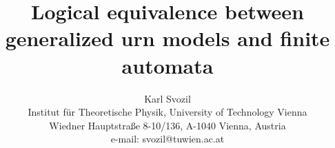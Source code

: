 \documentclass{article}






\title{Logical equivalence between generalized urn models and finite automata}
\author{Karl Svozil\\
 {\small Institut f\"ur Theoretische Physik, University of Technology Vienna }     \\
  {\small Wiedner Hauptstra\ss e 8-10/136,}
  {\small A-1040 Vienna, Austria   }            \\
  {\small e-mail: svozil@tuwien.ac.at}}

\maketitle
\begin{abstract}
To every generalized urn model there exists a finite (Mealy) automaton
with identical propositional calculus.
The converse is true as well.
\end{abstract}




\section{Introduction of concepts}

In what follows we shall explicitly and constructively demonstrate
the equivalence of the empirical logics
(i.e., the propositional calculi) associated with the
generalized urn models (GUM) suggested by
Ron Wright \cite{wright:pent,wright}, and automaton partition logics
(APL)
\cite{svozil-93,schaller-96,dvur-pul-svo,cal-sv-yu,svozil-ql}.
(The result has been  mentioned already in \cite[p.145]{svozil-ql}, but no proof has been given).
The logical equivalence of automaton models (AM)
with generalized urn models suggests that these logics are more general and ``robust''
with respect to changes of the particular model than could have been expected from
the particular instances of their first appearance.

